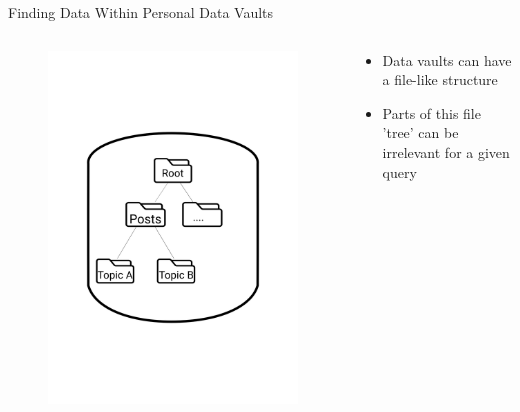 \begin{frame}{Finding Data Within Personal Data Vaults}
    \begin{columns}[T] %
        \begin{column}{.48\textwidth}          
            \begin{figure}
                \centering
                \includegraphics[height = .80\textheight]{figures/interiorOfDataVault}
            \end{figure}
        \end{column}%
        \hfill%
        \begin{column}{.48\textwidth}
            \bigskip
            \begin{itemize}
                \item Data vaults can have a file-like structure 
                \item Parts of this file 'tree' can be irrelevant for a given query

\end{itemize}
\end{column}
\end{columns}
\end{frame}
